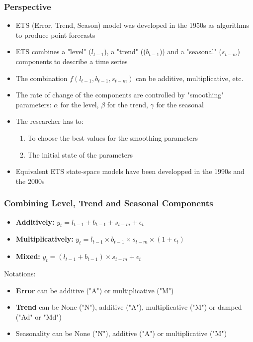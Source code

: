 \documentclass{beamer}
\begin{document}


\begin{frame}
  \frametitle{Perspective}
  
  \begin{itemize}
  \item ETS (Error, Trend, Season) model was developed in the 1950s as algorithms to produce point forecasts
  \item ETS combines a "level" ($l_{t-1}$), a "trend" (($b_{t-1}$)) and a "seasonal" ($s_{t-m}$) components to describe a time series
  \item The combination $f(l_{t-1}, b_{t-1}, s_{t-m})$ can be additive, multiplicative, etc.
  \item The rate of change of the components are controlled by "smoothing" parameters: $\alpha$ for the level, $\beta$ for the trend, $\gamma$ for the seasonal
  \item The researcher has to:
    \begin{enumerate}
    \item To choose the best values for the smoothing parameters 
    \item The initial state of the parameters
    \end{enumerate}
  \item Equivalent ETS state-space models have been developped in the 1990s and the 2000s
  \end{itemize}

  
\end{frame}


\begin{frame}
  \frametitle{Combining Level, Trend and Seasonal Components}

  \begin{itemize}
  \item \textbf{Additively:} $y_t = l_{t-1} + b_{t-1} + s_{t-m} + \epsilon_t$
  \item \textbf{Multiplicatively:} $y_t = l_{t-1} \times b_{t-1} \times s_{t-m} \times (1 + \epsilon_t)$
  \item \textbf{Mixed:} $y_t = (l_{t-1} + b_{t-1}) \times s_{t-m} + \epsilon_t $  
  \end{itemize}

  Notations:
  \begin{itemize}
  \item \textbf{Error} can be additive ("A") or multiplicative ("M")
  \item \textbf{Trend} can be None ("N"), additive ("A"), multiplicative ("M") or damped ("Ad" or "Md")
  \item Seasonality can be None ("N"), additive ("A") or multiplicative ("M")
  \end{itemize}
    
\end{frame}
\end{document}
